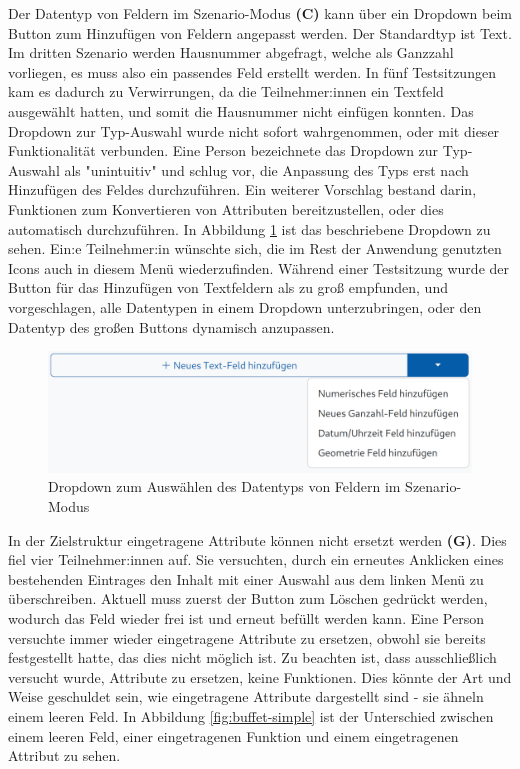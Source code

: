Der Datentyp von Feldern im Szenario-Modus \textbf{(C)} kann über ein Dropdown beim Button zum Hinzufügen von Feldern angepasst werden. Der Standardtyp ist Text. Im dritten Szenario werden Hausnummer abgefragt, welche als Ganzzahl vorliegen, es muss also ein passendes Feld erstellt werden. In fünf Testsitzungen kam es dadurch zu Verwirrungen, da die Teilnehmer:innen ein Textfeld ausgewählt hatten, und somit die Hausnummer nicht einfügen konnten. Das Dropdown zur Typ-Auswahl wurde nicht sofort wahrgenommen, oder mit dieser Funktionalität verbunden. Eine Person bezeichnete das Dropdown zur Typ-Auswahl als "unintuitiv" und schlug vor, die Anpassung des Typs erst nach Hinzufügen des Feldes durchzuführen. Ein weiterer Vorschlag bestand darin, Funktionen zum Konvertieren von Attributen bereitzustellen, oder dies automatisch durchzuführen. In Abbildung \ref{fig:type-dropdown} ist das beschriebene Dropdown zu sehen. Ein:e Teilnehmer:in wünschte sich, die im Rest der Anwendung genutzten Icons auch in diesem Menü wiederzufinden. Während einer Testsitzung wurde der Button für das Hinzufügen von Textfeldern als zu groß empfunden, und vorgeschlagen, alle Datentypen in einem Dropdown unterzubringen, oder den Datentyp des großen Buttons dynamisch anzupassen.

\begin{figure}
  \centering
  \includegraphics[width=.9\textwidth]{assets/datatype-dropdown.png}
  \caption{Dropdown zum Auswählen des Datentyps von Feldern im Szenario-Modus}
  \label{fig:type-dropdown}
\end{figure}

In der Zielstruktur eingetragene Attribute können nicht ersetzt werden \textbf{(G)}. Dies fiel vier Teilnehmer:innen auf. Sie versuchten, durch ein erneutes Anklicken eines bestehenden Eintrages den Inhalt mit einer Auswahl aus dem linken Menü zu überschreiben. Aktuell muss zuerst der Button zum Löschen gedrückt werden, wodurch das Feld wieder frei ist und erneut befüllt werden kann. Eine Person versuchte immer wieder eingetragene Attribute zu ersetzen, obwohl sie bereits festgestellt hatte, das dies nicht möglich ist. Zu beachten ist, dass ausschließlich versucht wurde, Attribute zu ersetzen, keine Funktionen. Dies könnte der Art und Weise geschuldet sein, wie eingetragene Attribute dargestellt sind - sie ähneln einem leeren Feld. In Abbildung \ref{fig:buffet-simple} ist der Unterschied zwischen einem leeren Feld, einer eingetragenen Funktion und einem eingetragenen Attribut zu sehen.

